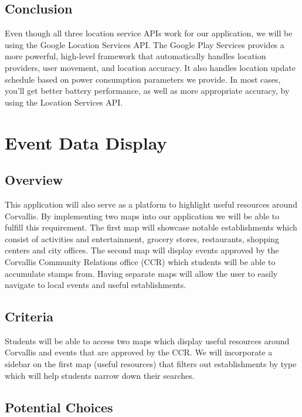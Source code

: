 \documentclass[onecolumn, draftclsnofoot,10pt, compsoc]{IEEEtran}
\begin{document}
\subsection{Conclusion}
Even though all three location service APIs work for our application, we will be using the Google Location Services API. The Google Play Services provides a more powerful, high-level framework that automatically handles location providers, user movement, and location accuracy. It also handles location update schedule based on power consumption parameters we provide. In most cases, you'll get better battery performance, as well as more appropriate accuracy, by using the Location Services API.\\



\section{Event Data Display}
\subsection{Overview}
This application will also serve as a platform to highlight useful resources around Corvallis. By implementing two maps into our application we will be able to fulfill this requirement. The first map will showcase notable establishments which consist of activities and entertainment, grocery stores, restaurants, shopping centers and city offices. The second map will display events approved by the Corvallis Community Relations office (CCR) which students will be able to accumulate stamps from. Having separate maps will allow the user to easily navigate to local events and useful establishments.  

\subsection{Criteria}

Students will be able to access two maps which display useful resources around Corvallis and events that are approved by the CCR. We will incorporate a sidebar on the first map (useful resources) that filters out establishments by type which will help students narrow down their searches. 

\subsection{Potential Choices}
\end{document}
